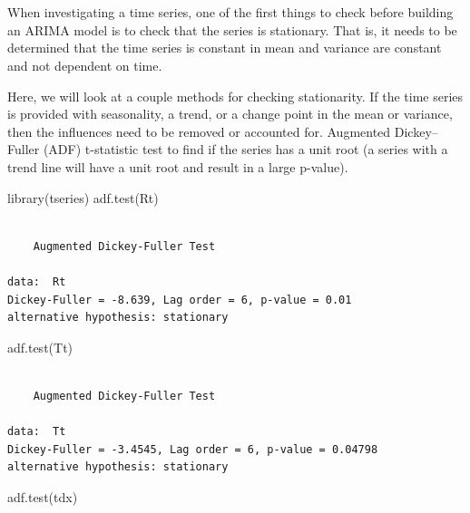 \documentclass[
  letterpaper,
  DIV=11,
  numbers=noendperiod]{scrartcl}
\newenvironment{Shaded}{\begin{snugshade}}{\end{snugshade}}
\newcommand{\FunctionTok}[1]{\textcolor[rgb]{0.28,0.35,0.67}{#1}}
\newcommand{\NormalTok}[1]{\textcolor[rgb]{0.00,0.23,0.31}{#1}}
\begin{document}
\hypertarget{section-1}{%
\section{}\label{section-1}}

When investigating a time series, one of the first things to check
before building an ARIMA model is to check that the series is
stationary. That is, it needs to be determined that the time series is
constant in mean and variance are constant and not dependent on time.

Here, we will look at a couple methods for checking stationarity. If the
time series is provided with seasonality, a trend, or a change point in
the mean or variance, then the influences need to be removed or
accounted for. Augmented Dickey--Fuller (ADF) t-statistic test to find
if the series has a unit root (a series with a trend line will have a
unit root and result in a large p-value).

\begin{Shaded}
\begin{Highlighting}[]
\FunctionTok{library}\NormalTok{(tseries)}
\FunctionTok{adf.test}\NormalTok{(Rt)}
\end{Highlighting}
\end{Shaded}

\begin{verbatim}

    Augmented Dickey-Fuller Test

data:  Rt
Dickey-Fuller = -8.639, Lag order = 6, p-value = 0.01
alternative hypothesis: stationary
\end{verbatim}

\begin{Shaded}
\begin{Highlighting}[]
\FunctionTok{adf.test}\NormalTok{(Tt)}
\end{Highlighting}
\end{Shaded}

\begin{verbatim}

    Augmented Dickey-Fuller Test

data:  Tt
Dickey-Fuller = -3.4545, Lag order = 6, p-value = 0.04798
alternative hypothesis: stationary
\end{verbatim}

\begin{Shaded}
\begin{Highlighting}[]
\FunctionTok{adf.test}\NormalTok{(tdx)}
\end{Highlighting}
\end{Shaded}
\end{document}
